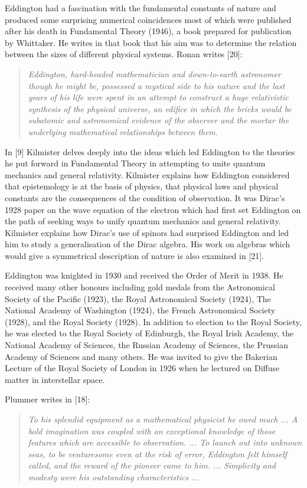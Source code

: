 Eddington had a fascination with the fundamental constants of nature and produced some surprising numerical coincidences most of which were published after his death in Fundamental Theory (1946), a book prepared for publication by Whittaker. He writes in that book that his aim was to determine the relation between the sizes of different physical systems. Ronan writes [20]:
\begin{quote}
\textit{Eddington, hard-headed mathematician and down-to-earth astronomer though he might be, possessed a mystical side to his nature and the last years of his life were spent in an attempt to construct a huge relativistic synthesis of the physical universe, an edifice in which the bricks would be subatomic and astronomical evidence of the observer and the mortar the underlying mathematical relationships between them.}
\end{quote}

In [9] Kilmister delves deeply into the ideas which led Eddington to the theories he put forward in Fundamental Theory in attempting to unite quantum mechanics and general relativity. Kilmister explains how Eddington considered that epistemology is at the basis of physics, that physical laws and physical constants are the consequences of the condition of observation. It was Dirac's 1928 paper on the wave equation of the electron which had first set Eddington on the path of seeking ways to unify quantum mechanics and general relativity. Kilmister explains how Dirac's use of spinors had surprised Eddington and led him to study a generalisation of the Dirac algebra. His work on algebras which would give a symmetrical description of nature is also examined in [21].

Eddington was knighted in 1930 and received the Order of Merit in 1938. He received many other honours including gold medals from the Astronomical Society of the Pacific (1923), the Royal Astronomical Society (1924), The National Academy of Washington (1924), the French Astronomical Society (1928), and the Royal Society (1928). In addition to election to the Royal Society, he was elected to the Royal Society of Edinburgh, the Royal Irish Academy, the National Academy of Sciences, the Russian Academy of Sciences, the Prussian Academy of Sciences and many others. He was invited to give the Bakerian Lecture of the Royal Society of London in 1926 when he lectured on Diffuse matter in interstellar space.

Plummer writes in [18]:
\begin{quote}
\textit{To his splendid equipment as a mathematical physicist he owed much ... A bold imagination was coupled with an exceptional knowledge of those features which are accessible to observation. ... To launch out into unknown seas, to be venturesome even at the risk of error, Eddington felt himself called, and the reward of the pioneer came to him. ... Simplicity and modesty were his outstanding characteristics ...}
\end{quote}

